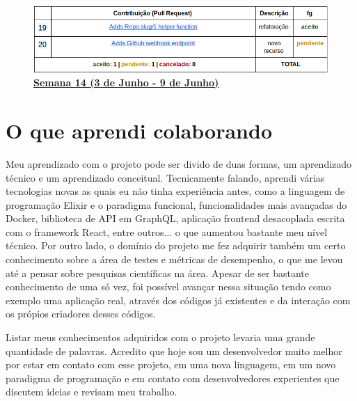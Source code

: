 \begin{figure}
  \caption{\textbf{\underline{Semana 14 (3 de Junho - 9 de Junho)}}}
  \includegraphics[width=\linewidth]{figuras/contribs-9.png}
\end{figure}

\section{O que aprendi colaborando}
\label{cap:o-que-aprendi}

 Meu aprendizado com o projeto pode ser divido de duas formas,
 um aprendizado técnico e um aprendizado conceitual. Tecnicamente falando,
 aprendi várias tecnologias novas as quais eu não tinha experiência antes, como a
 linguagem de programação Elixir e o paradigma funcional, funcionalidades mais
 avançadas do Docker, biblioteca de API em GraphQL, aplicação frontend desacoplada escrita com o
 framework React, entre outros... o que aumentou bastante meu nível técnico.
 Por outro lado, o domínio do projeto me fez adquirir também um
 certo conhecimento sobre a área de testes e métricas de desempenho, o que me
 levou até a pensar sobre pesquisas científicas na área. Apesar de ser bastante
 conhecimento de uma só vez, foi possível avançar nessa situação tendo como
 exemplo uma aplicação real, através dos códigos já existentes e da interação
 com os própios criadores desses códigos.

 Listar meus conhecimentos adquiridos com o projeto levaria uma grande quantidade
 de palavras. Acredito que hoje sou um desenvolvedor muito melhor por estar
 em contato com esse projeto, em uma nova linguagem, em um novo paradigma de programação
 e em contato com desenvolvedores experientes que discutem ideias e revisam meu trabalho.
